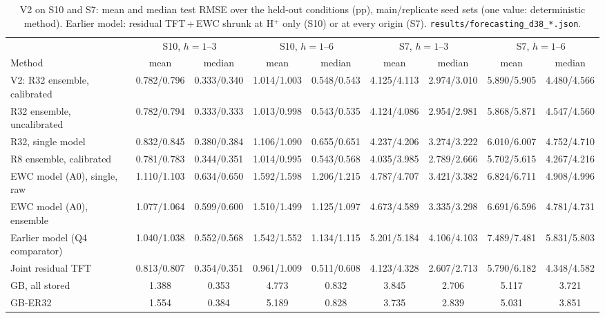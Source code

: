 \documentclass[conference]{IEEEtran}
\begin{document}
\begin{table}[t]
  \centering
  \caption{V2 on S10 and S7: mean and median test RMSE over the held-out conditions (pp), main/replicate seed sets (one
    value: deterministic method). Earlier model: residual TFT\,+\,EWC shrunk at H$^+$ only (S10) or at every origin (S7).
    \texttt{results/forecasting\_d38\_*.json}.}
  \label{tab:d38_means}
  \setlength{\tabcolsep}{3pt}
  \scriptsize
  \begin{tabular}{lcccccccc}
    \toprule
    & \multicolumn{2}{c}{S10, $h{=}1$--3} & \multicolumn{2}{c}{S10, $h{=}1$--6} & \multicolumn{2}{c}{S7, $h{=}1$--3} & \multicolumn{2}{c}{S7, $h{=}1$--6} \\
    \cmidrule(lr){2-3}\cmidrule(lr){4-5}\cmidrule(lr){6-7}\cmidrule(lr){8-9}
    Method & mean & median & mean & median & mean & median & mean & median \\
    \midrule
    V2: R32 ensemble, calibrated & 0.782/0.796 & 0.333/0.340 & 1.014/1.003 & 0.548/0.543 & 4.125/4.113 & 2.974/3.010 & 5.890/5.905 & 4.480/4.566 \\
    R32 ensemble, uncalibrated & 0.782/0.794 & 0.333/0.333 & 1.013/0.998 & 0.543/0.535 & 4.124/4.086 & 2.954/2.981 & 5.868/5.871 & 4.547/4.560 \\
    R32, single model & 0.832/0.845 & 0.380/0.384 & 1.106/1.090 & 0.655/0.651 & 4.237/4.206 & 3.274/3.222 & 6.010/6.007 & 4.752/4.710 \\
    R8 ensemble, calibrated & 0.781/0.783 & 0.344/0.351 & 1.014/0.995 & 0.543/0.568 & 4.035/3.985 & 2.789/2.666 & 5.702/5.615 & 4.267/4.216 \\
    EWC model (A0), single, raw & 1.110/1.103 & 0.634/0.650 & 1.592/1.598 & 1.206/1.215 & 4.787/4.707 & 3.421/3.382 & 6.824/6.711 & 4.908/4.996 \\
    EWC model (A0), ensemble & 1.077/1.064 & 0.599/0.600 & 1.510/1.499 & 1.125/1.097 & 4.673/4.589 & 3.335/3.298 & 6.691/6.596 & 4.781/4.731 \\
    Earlier model (Q4 comparator) & 1.040/1.038 & 0.552/0.568 & 1.542/1.552 & 1.134/1.115 & 5.201/5.184 & 4.106/4.103 & 7.489/7.481 & 5.831/5.803 \\
    Joint residual TFT & 0.813/0.807 & 0.354/0.351 & 0.961/1.009 & 0.511/0.608 & 4.123/4.328 & 2.607/2.713 & 5.790/6.182 & 4.348/4.582 \\
    GB, all stored & 1.388 & 0.353 & 4.773 & 0.832 & 3.845 & 2.706 & 5.117 & 3.721 \\
    GB-ER32 & 1.554 & 0.384 & 5.189 & 0.828 & 3.735 & 2.839 & 5.031 & 3.851 \\

\end{tabular}
\end{table}
\end{document}
